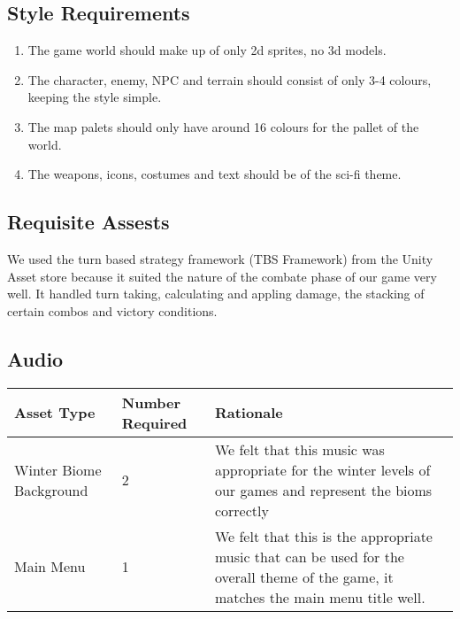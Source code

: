 \documentclass{article}
\begin{document}
\subsection{Style Requirements}
\begin{enumerate}[{SR}1. ]
	\item The game world should make up of only 2d sprites, no 3d models.
	\item The character, enemy, NPC and terrain should consist of only 3-4 colours, keeping the style simple.
	\item The map palets should only have around 16 colours for the pallet of the world.
	\item The weapons, icons, costumes and text should be of the sci-fi theme.
\end{enumerate}
\subsection{Requisite Assests}
\quad We used the turn based strategy framework (TBS Framework) from the Unity Asset store because it suited the nature of the combate phase of our game very well. It handled turn taking, calculating and appling damage, the stacking of certain combos and victory conditions.
\subsection{Audio}
\begin{center}
\begin{tabular}{ | m{5cm} | m{5cm}|m{5cm}|} 
\hline
Asset Type & Number Required & Rationale\\ 
\hline
Winter Biome Background & 2 & We felt that this music was appropriate for the winter levels of our games and represent the bioms correctly\\
Main Menu & 1 & We felt that this is the appropriate music that can be used for the overall theme of the game, it matches the main menu title well.
\hline
\end{tabular}
\end{center}
\end{document}
